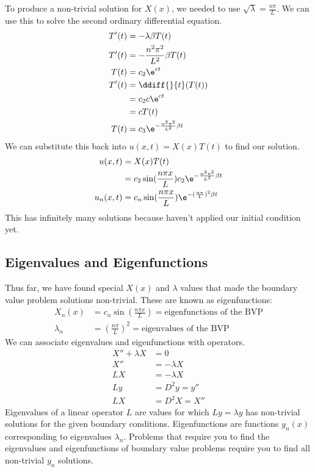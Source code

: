 \documentclass{math}
\begin{document}
To produce a non-trivial solution for \( X(x) \), we needed to use
\( \sqrt{\lambda} = \frac{n\pi}{L} \). We can use this to solve the second
ordinary differential equation.
\begin{align*}
  T'(t) &= -\lambda\beta T(t) \\
  T'(t) &= -\frac{n^2\pi^2}{L^2}\beta T(t) \\
  T(t) &= c_2\e^{ct} \\
  T'(t) &= \ddiff{}{t}(T(t)) \\
  &= c_2c\e^{ct} \\
  &= cT(t) \\
  T(t) &= c_3\e^{-\frac{n^2\pi^2}{L^2}\beta t}
\end{align*}
We can substitute this back into \( u(x,t) = X(x)T(t) \) to find our solution.
\begin{align*}
  u(x,t) &= X(x)T(t) \\
  &= c_2\sin(\frac{n\pi x}{L})c_2\e^{-\frac{n^2\pi^2}{L^2}\beta t} \\
  u_n(x,t) &= c_n\sin(\frac{n\pi x}{L})\e^{-(\frac{n\pi}{L})^2\beta t}
\end{align*}
This has infinitely many solutions because haven't applied our initial condition
yet.

\subsection*{Eigenvalues and Eigenfunctions}
Thus far, we have found special \( X(x) \) and \( \lambda \) values that made
the boundary value problem solutions non-trivial. These are known as
eigenfunctions:
\begin{align*}
  X_n(x) &= c_n\sin(\frac{n\pi x}{L}) = \text{eigenfunctions of the BVP} \\
  \lambda_n &= (\frac{n\pi}{L})^2 = \text{eigenvalues of the BVP}
\end{align*}
We can associate eigenvalues and eigenfunctions with operators.
\begin{align*}
  X''+\lambda X &= 0 \\
  X'' &= -\lambda X \\
  LX &= -\lambda X \\
  Ly &= D^2y = y'' \\
  LX &= D^2X = X''
\end{align*}
Eigenvalues of a linear operator \( L \) are values for which \( Ly =
\lambda y \) has non-trivial solutions for the given boundary conditions.
Eigenfunctions are functions \( y_n(x) \) corresponding to eigenvalues
\( \lambda_n \). Problems that require you to find the eigenvalues and
eigenfunctions of boundary value problems require you to find all non-trivial
\( y_n \) solutions.
\end{document}
